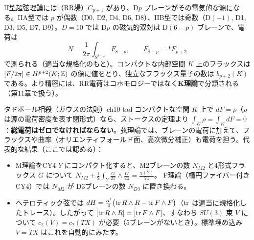 \begin{center}
\end{center}

\begin{physbox}[：Dブレーンと RR 場]
II型超弦理論には（RR場）$C_{p+1}$ があり、D$p$ ブレーンがその電気的な源になる。IIA型では $p$ が偶数（D0, D2, D4, D6, D8）、IIB型では奇数（D$(-1)$, D1, D3, D5, D7, D9）。$D=10$ では D$p$ の磁気的双対は D$(6-p)$ ブレーンで、電荷は
\[
N=\frac{1}{2\pi}\int_{S^{8-p}}F_{8-p},\qquad F_{8-p}={*F_{p+2}}
\]
で測られる（適当な規格化のもと）。コンパクトな内部空間 $K$ 上のフラックスは $[F/2\pi]\in H^{p+2}(K;\mathbb{Z})$ の像に値をとり、独立なフラックス量子の数は $b_{p+2}(K)$ である。より精密には、RR電荷はコホモロジーではなく\textbf{K理論}で分類される（第11章で扱う）。
\end{physbox}

\begin{myprop}{タドポール相殺（ガウスの法則）}{ch10-tad}
コンパクトな空間 $K$ 上で $dF=\rho$（$\rho$ は源の電荷密度を表す閉形式）なら、ストークスの定理より $\int_K\rho=\int_KdF=0$：\textbf{総電荷はゼロでなければならない}。弦理論では、ブレーンの電荷に加えて、フラックスや曲率（オリエンティフォールド面、高次微分補正）も電荷を担う。代表的な結果（ここでは認める）：
\begin{itemize}
\item M理論をCY4 $Y$ にコンパクト化すると、M2ブレーンの数 $N_{M2}$ と4形式フラックス $G$ について
$\displaystyle N_{M2}+\frac12\int_Y\frac{G}{2\pi}\wedge\frac{G}{2\pi}=\frac{\chi(Y)}{24}$。
F理論（楕円ファイバー付きCY4）では $N_{M2}$ が D3ブレーンの数 $N_{D3}$ に置き換わる。
\item ヘテロティック弦では $dH=\frac{\alpha'}{4}\bigl(\tr R\wedge R-\tr F\wedge F\bigr)$（$\tr$ は適当に規格化したトレース）。したがって $[\tr R\wedge R]=[\tr F\wedge F]$、すなわち $SU(3)$ 束 $V$ について $c_2(V)=c_2(TX)$ が必要（5ブレーンがないとき）。標準埋め込み $V=TX$ はこれを自動的にみたす。
\end{itemize}
\end{myprop}

